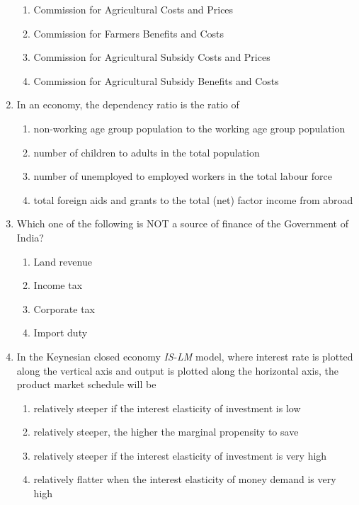 \documentclass[journal,12pt,onecolumn]{exam}
\theoremstyle{remark}
\begin{document}
\begin{enumerate}
  \begin{enumerate}[label=(\Alph*)]
    \item Commission for Agricultural Costs and Prices
    \item Commission for Farmers Benefits and Costs
    \item Commission for Agricultural Subsidy Costs and Prices
    \item Commission for Agricultural Subsidy Benefits and Costs
  \end{enumerate}

  \item In an economy, the dependency ratio is the ratio of

  \begin{enumerate}[label=(\Alph*)]
    \item non-working age group population to the working age group population
    \item number of children to adults in the total population
    \item number of unemployed to employed workers in the total labour force
    \item total foreign aids and grants to the total (net) factor income from abroad
  \end{enumerate}

  \item Which one of the following is NOT a source of finance of the Government of India?

  \begin{enumerate}[label=(\Alph*)]
    \item Land revenue
    \item Income tax
    \item Corporate tax
    \item Import duty
  \end{enumerate}
\newpage

\item In the Keynesian closed economy \textit{IS-LM} model, where interest rate is plotted along the vertical axis and output is plotted along the horizontal axis, the product market schedule will be

  \begin{enumerate}[label=(\Alph*)]
    \item relatively steeper if the interest elasticity of investment is low
    \item relatively steeper, the higher the marginal propensity to save
    \item relatively steeper if the interest elasticity of investment is very high
    \item relatively flatter when the interest elasticity of money demand is very high
  \end{enumerate}


\end{enumerate}
\end{document}
